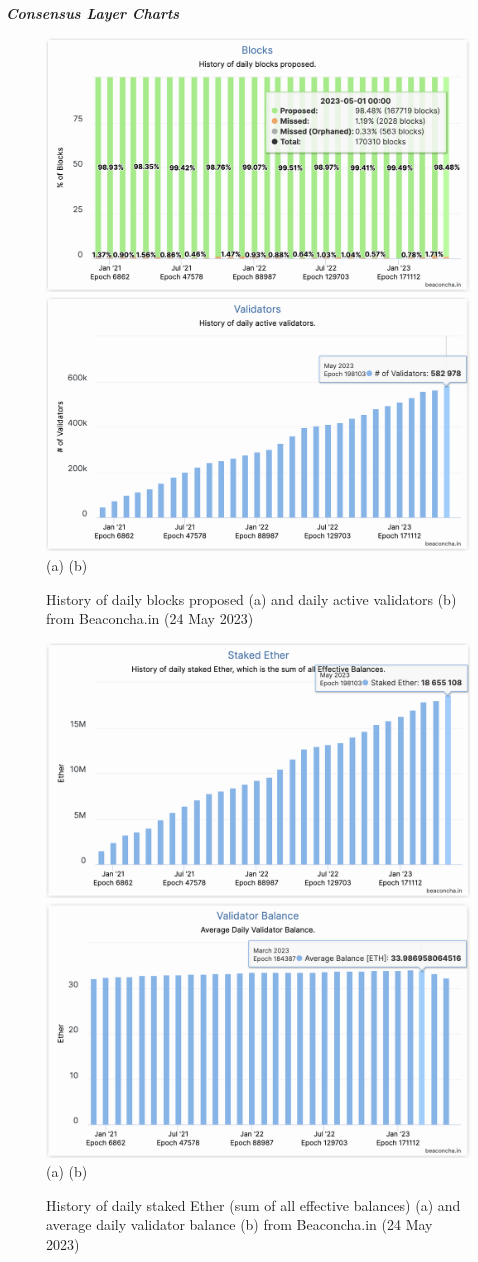 \documentclass[UTF8]{article}
\begin{document}
\clearpage
\textit{\textbf{Consensus Layer Charts}}
\begin{figure}[htbp]
\begin{center}
\includegraphics[width=0.48\linewidth]{images/bchart1}
\includegraphics[width=0.48\linewidth]{images/bchart2} \\
(a)\hspace{160pt}        (b)\\
\caption{History of daily blocks proposed (a) and daily active validators (b) from Beaconcha.in (24 May 2023)}
\label{fig:chart1}
\end{center}
\end{figure}

\begin{figure}[htbp]
\begin{center}
\includegraphics[width=0.48\linewidth]{images/bchart3}
\includegraphics[width=0.48\linewidth]{images/bchart4} \\
(a)\hspace{160pt}        (b)\\
\caption{History of daily staked Ether (sum of all effective balances) (a) and average daily validator balance (b) from Beaconcha.in (24 May 2023)}
\label{fig:chart3}
\end{center}
\end{figure}
\end{document}
